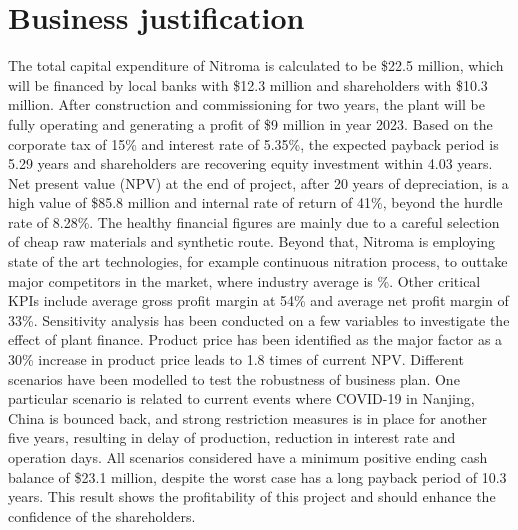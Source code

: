 \section*{Business justification}


The total capital expenditure of Nitroma is calculated to be \$22.5 million, which will be financed by local banks with \$12.3 million and shareholders with \$10.3 million. After construction and commissioning for two years, the plant will be fully operating and generating a profit of \$9 million in year 2023. Based on the corporate tax of 15\% and interest rate of 5.35\%, the expected payback period is 5.29 years and shareholders are recovering equity investment within 4.03 years. Net present value (NPV) at the end of project, after 20 years of depreciation, is a high value of \$85.8 million and internal rate of return of 41\%, beyond the hurdle rate of 8.28\%. The healthy financial figures are mainly due to a careful selection of cheap raw materials and synthetic route. Beyond that, Nitroma is employing state of the art technologies, for example continuous nitration process, to outtake major competitors in the market, where industry average is \%. Other critical KPIs include average gross profit margin at 54\% and average net profit margin of 33\%. 
Sensitivity analysis has been conducted on a few variables to investigate the effect of plant finance. Product price has been identified as the major factor as a 30\% increase in product price leads to 1.8 times of current NPV. Different scenarios have been modelled to test the robustness of business plan. One particular scenario is related to current events where COVID-19 in Nanjing, China is bounced back, and strong restriction measures is in place for another five years, resulting in delay of production, reduction in interest rate and operation days. All scenarios considered have a minimum positive ending cash balance of \$23.1 million, despite the worst case has a long payback period of 10.3 years. This result shows the profitability of this project and should enhance the confidence of the shareholders.
